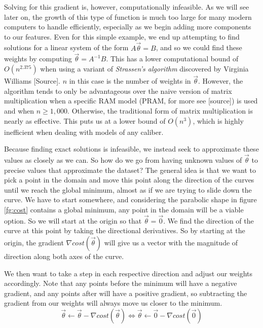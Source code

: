 Solving for this gradient is, however, computationally infeasible. As we will
see later on, the growth of this type of function is much too large for many
modern computers to handle efficiently, especially as we begin adding more
components to our features. Even for this simple example, we end up attempting
to find solutions for a linear system of the form $A\vec\theta = B$, and so we could find these weights
by computing $\vec\theta =A^{-1}B$. This has a lower computational bound of
$O(n^{2.375})$ when using a variant of \emph{Strassen's algorithm} discovered by
Virginia Williams [Source]. $n$ in this case is the number of weights in
$\vec\theta$. However, the algorithm tends to only be advantageous over the naive
version of matrix multiplication when a specific RAM model (PRAM, for more see
[source]) is used and when $n \geq 1,000$. Otherwise, the traditional form of
matrix multiplication is nearly as effective. This puts us at a lower bound of
$O(n^3)$, which is highly inefficient when dealing with models of any caliber.

Because finding exact solutions is infeasible, we instead seek to approximate
these values as closely as we can. So how do we go from having unknown values of
$\vec\theta$ to precise values that approximate the dataset? The general idea is
that we want to pick a point in the domain and move this point along the direction of the curves until we reach the global minimum, almost as if we are trying to slide down the curve. We have to start
somewhere, and considering the parabolic shape in figure \ref{fg:cost} contains a
global minimum, any point in the domain will be a viable option. So we will start at the origin so that $\vec\theta = \vec0$. We find the direction of the curve at this point by taking the directional derivatives. So by starting at the origin, the gradient $\nabla cost(\vec\theta)$ will give us a vector with the magnitude of direction along both axes of the curve.

We then want to take a step in each respective direction and adjust our weights accordingly. Note that any points before the minimum will have a negative gradient, and any points after will have a positive gradient, so subtracting the gradient from our weights will always move us closer to the minimum.
\begin{equation}
\vec\theta \leftarrow \vec\theta - \nabla cost(\vec\theta) \Longleftrightarrow \vec\theta \leftarrow \vec0 - \nabla cost(\vec0)
\end{equation}


